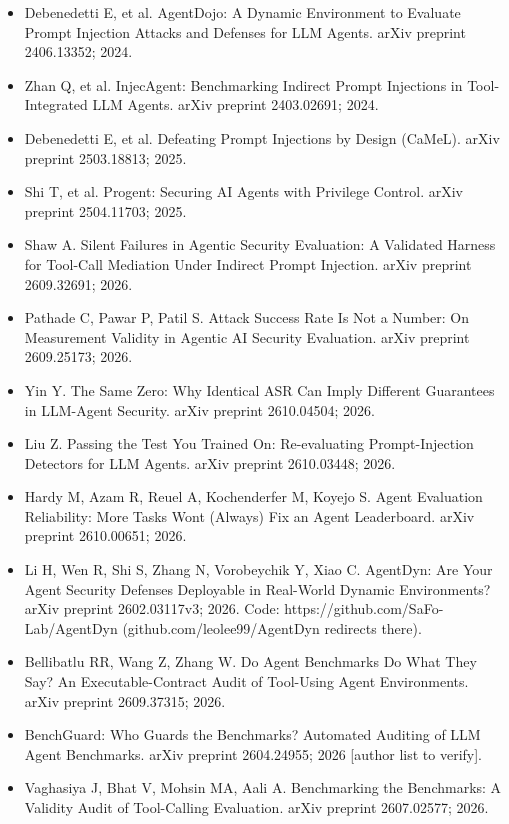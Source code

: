 \documentclass[10pt]{article}
\providecommand{\tightlist}{\setlength{\itemsep}{0pt}\setlength{\parskip}{0pt}}
\begin{document}
\begin{itemize}
\tightlist
\item
  Debenedetti E, et al. AgentDojo: A Dynamic Environment to Evaluate Prompt Injection Attacks and Defenses for LLM Agents. arXiv preprint 2406.13352; 2024.
\item
  Zhan Q, et al. InjecAgent: Benchmarking Indirect Prompt Injections in Tool-Integrated LLM Agents. arXiv preprint 2403.02691; 2024.
\item
  Debenedetti E, et al. Defeating Prompt Injections by Design (CaMeL). arXiv preprint 2503.18813; 2025.
\item
  Shi T, et al. Progent: Securing AI Agents with Privilege Control. arXiv preprint 2504.11703; 2025.
\item
  Shaw A. Silent Failures in Agentic Security Evaluation: A Validated Harness for Tool-Call Mediation Under Indirect Prompt Injection. arXiv preprint 2609.32691; 2026.
\item
  Pathade C, Pawar P, Patil S. Attack Success Rate Is Not a Number: On Measurement Validity in Agentic AI Security Evaluation. arXiv preprint 2609.25173; 2026.
\item
  Yin Y. The Same Zero: Why Identical ASR Can Imply Different Guarantees in LLM-Agent Security. arXiv preprint 2610.04504; 2026.
\item
  Liu Z. Passing the Test You Trained On: Re-evaluating Prompt-Injection Detectors for LLM Agents. arXiv preprint 2610.03448; 2026.
\item
  Hardy M, Azam R, Reuel A, Kochenderfer M, Koyejo S. Agent Evaluation Reliability: More Tasks Won\textquotesingle t (Always) Fix an Agent Leaderboard. arXiv preprint 2610.00651; 2026.
\item
  Li H, Wen R, Shi S, Zhang N, Vorobeychik Y, Xiao C. AgentDyn: Are Your Agent Security Defenses Deployable in Real-World Dynamic Environments? arXiv preprint 2602.03117v3; 2026. Code: https://github.com/SaFo-Lab/AgentDyn (github.com/leolee99/AgentDyn redirects there).
\item
  Bellibatlu RR, Wang Z, Zhang W. Do Agent Benchmarks Do What They Say? An Executable-Contract Audit of Tool-Using Agent Environments. arXiv preprint 2609.37315; 2026.
\item
  BenchGuard: Who Guards the Benchmarks? Automated Auditing of LLM Agent Benchmarks. arXiv preprint 2604.24955; 2026 {[}author list to verify{]}.
\item
  Vaghasiya J, Bhat V, Mohsin MA, Aali A. Benchmarking the Benchmarks: A Validity Audit of Tool-Calling Evaluation. arXiv preprint 2607.02577; 2026.

\end{itemize}
\end{document}
